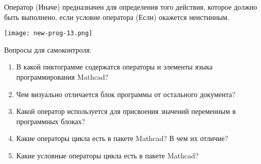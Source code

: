 Оператор  (Иначе) предназначен для определения того действия, которое должно быть выполнено, если условие оператора  (Если) окажется неистинным.


\begin{center}
	\texttt{[image: new-prog-13.png]}
\end{center}


Вопросы для самоконтроля:
\begin{enumerate}
	\item В какой пиктограмме содержатся операторы и элементы языка программирования Mathcad?
	\item Чем визуально отличается блок программы от остального документа?
	\item Какой оператор используется для присвоения значений переменным в программных блоках?
	\item Какие операторы цикла есть в пакете Mathcad? В чем их отличие?
	\item Какие условные операторы цикла есть в пакете Mathcad?
\end{enumerate}
